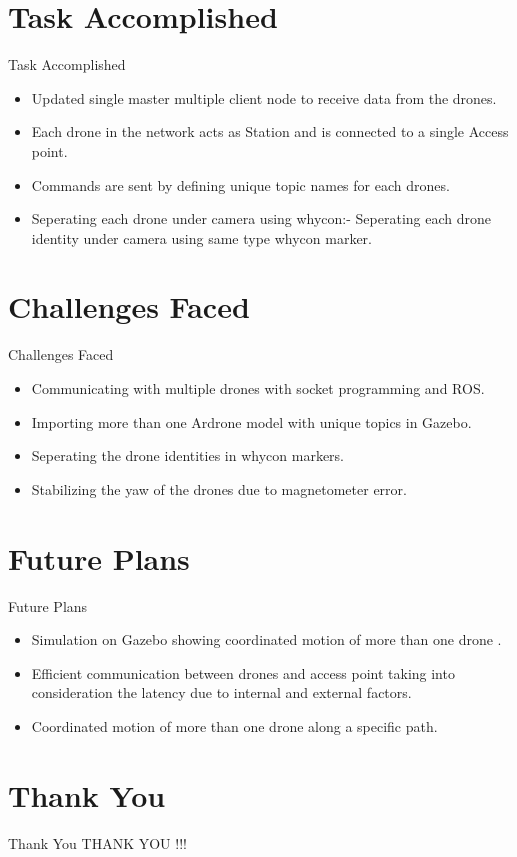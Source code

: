 \documentclass[10pt, a4paper]{beamer}
\begin{document}
\section{Task Accomplished}
\begin{frame}{Task Accomplished}
	\begin{itemize}
              
                \item Updated single master multiple client node to receive data from the drones.
             \item Each drone in the network acts as Station and is connected to a single Access point.
        \item Commands are sent by defining unique topic names for each drones.
		
		
\item Seperating each drone under camera using whycon:-
Seperating each drone identity under camera using same type whycon marker.
	\end{itemize}
\end{frame}

\section{Challenges Faced}
\begin{frame}{Challenges Faced}
	\begin{itemize}
               
		\item Communicating with multiple drones with socket programming and ROS.
\item Importing more than one Ardrone model with unique topics in Gazebo.                 
\item Seperating the drone identities in whycon markers.
                \item Stabilizing the yaw of the drones due to magnetometer error.
                 
	\end{itemize}
\end{frame}

\section{Future Plans}
\begin{frame}{Future Plans}
	\begin{itemize}
\item Simulation on Gazebo showing coordinated motion of more than one drone .
		\item Efficient communication between drones and access point taking into consideration the latency due to internal and external factors.
\item Coordinated motion of more than one drone along a specific path.
	\end{itemize}
\end{frame}


\section{Thank You}
\begin{frame}{Thank You}
	\centering THANK YOU !!!
\end{frame}
\end{document}
